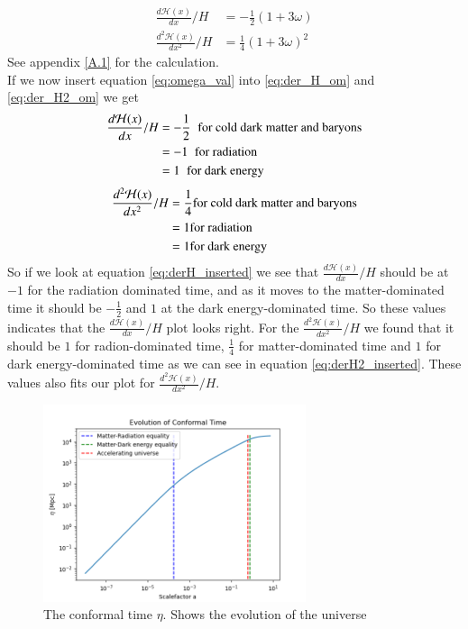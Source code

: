 \documentclass{aa}
\begin{document}
\begin{align}
    \frac{d\mathcal{H}(x)}{dx}/H&=-\frac{1}{2}(1+3\omega) \label{eq:der_H_om}\\
    \frac{d^2\mathcal{H}(x)}{dx^2}/H&=\frac{1}{4}(1+3\omega)^2 \label{eq:der_H2_om}
\end{align}
See appendix \eqref{A.1} for the calculation.\\
If we now insert equation \eqref{eq:omega_val} into \eqref{eq:der_H_om} and \eqref{eq:der_H2_om} we get
\begin{align}
\frac{d\mathcal{H}(x)}{dx}/H&=
  -\frac{1}{2}\;\; \text{for cold dark matter and baryons}\notag\\
  &=-1\;\; \text{for radiation}\notag\\
  &=1\;\; \text{for dark energy}
 \label{eq:derH_inserted}
\end{align}
\begin{align}
\frac{d^2\mathcal{H}(x)}{dx^2}/H&=
  \frac{1}{4}\text{for cold dark matter and baryons}\notag\\
  &=1\text{for radiation}\notag\\
    &=1 \text{for dark energy}  \label{eq:derH2_inserted}
\end{align}
So if we look at equation \eqref{eq:derH_inserted} we see that $\frac{d\mathcal{H}(x)}{dx}/H$ should be at $-1$ for the radiation dominated time, and as it moves to the matter-dominated time it should be $-\frac{1}{2}$ and $1$ at the dark energy-dominated time. So these values indicates that the $\frac{d\mathcal{H}(x)}{dx}/H$ plot looks right. For the $\frac{d^2\mathcal{H}(x)}{dx^2}/H$ we found that it should be $1$ for radion-dominated time, $\frac{1}{4}$ for matter-dominated time and $1$ for dark energy-dominated time as we can see in equation \eqref{eq:derH2_inserted}. These values also fits our plot for $\frac{d^2\mathcal{H}(x)}{dx^2}/H$.  
\begin{figure}[H]
	\centering
	\includegraphics[width=77mm]{Evolution of Conformal Time.png}
	\caption{The conformal time $\eta$. Shows the evolution of the universe}
	\label{fig:Ev_Conf_time(x)}
\end{figure}
\end{document}
